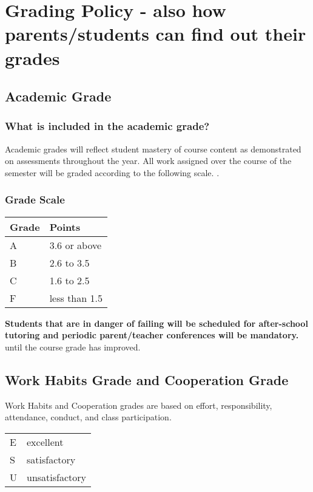 \documentclass[11pt]{article}
\begin{document}
\section{Grading Policy - also how parents/students can find out their grades}
\label{sec:org9e70eed}
\subsection{Academic Grade}
\label{sec:org524d6c4}
\subsubsection{What is included in the academic grade?}
\label{sec:org3024905}
Academic grades will reflect student mastery of course content as demonstrated on assessments throughout the year. All work assigned over the course of the semester will be graded according to the following scale.
. 
\subsubsection{Grade Scale}
\label{sec:orga186c0e}

\begin{center}
\begin{tabular}{ll}
\hline
Grade & Points\\[0pt]
\hline
A & 3.6 or above\\[0pt]
\hline
B & 2.6 to 3.5\\[0pt]
\hline
C & 1.6 to 2.5\\[0pt]
\hline
F & less than 1.5\\[0pt]
\hline
\end{tabular}
\end{center}

\textbf{\textbf{Students that are in danger of failing will be scheduled for after-school tutoring and periodic parent/teacher conferences will be mandatory.}} until the course grade has improved.

\subsection{Work Habits Grade and Cooperation Grade}
\label{sec:orgdcdd22e}

Work Habits and Cooperation grades are based on effort, responsibility, attendance, conduct, and class participation. 

\begin{center}
\begin{tabular}{ll}
E & excellent\\[0pt]
S & satisfactory\\[0pt]
U & unsatisfactory\\[0pt]
\end{tabular}
\end{center}
\end{document}
